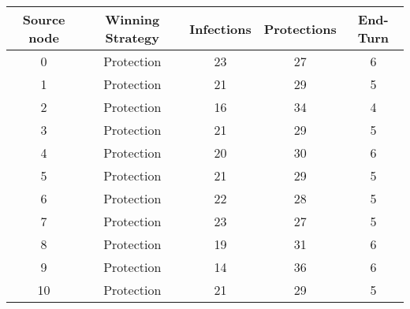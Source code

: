 \documentclass[results.tex]{subfiles}
\begin{document}
    \begin{center}
        \begin{tabular}{| c || c | c | c | c |}
            \hline
            {\bfseries Source node} & {\bfseries Winning Strategy} & {\bfseries Infections} & {\bfseries Protections}
            & {\bfseries End-Turn}
            \\  %
            \hline\hline
            0                       & Protection                   & 23                     & 27                      & 6                    \\
            \hline
            1                       & Protection                   & 21                     & 29                      & 5                    \\
            \hline
            2                       & Protection                   & 16                     & 34                      & 4                    \\
            \hline
            3                       & Protection                   & 21                     & 29                      & 5                    \\
            \hline
            4                       & Protection                   & 20                     & 30                      & 6                    \\
            \hline
            5                       & Protection                   & 21                     & 29                      & 5                    \\
            \hline
            6                       & Protection                   & 22                     & 28                      & 5                    \\
            \hline
            7                       & Protection                   & 23                     & 27                      & 5                    \\
            \hline
            8                       & Protection                   & 19                     & 31                      & 6                    \\
            \hline
            9                       & Protection                   & 14                     & 36                      & 6                    \\
            \hline
            10                      & Protection                   & 21                     & 29                      & 5                    \\

\end{tabular}
\end{center}
\end{document}
